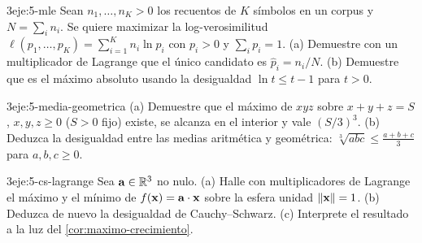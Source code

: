 \begin{ejercicio}{3}{eje:5-mle}
Sean $n_1,\dots,n_K>0$ los recuentos de $K$ símbolos en un corpus y $N=\sum_in_i$. Se quiere maximizar la log-verosimilitud $\ell(p_1,\dots,p_K)=\sum_{i=1}^{K}n_i\ln p_i$ con $p_i>0$ y $\sum_ip_i=1$. (a) Demuestre con un multiplicador de Lagrange que el único candidato es $\hat p_i=n_i/N$. (b) Demuestre que es el máximo absoluto usando la desigualdad $\ln t\le t-1$ para $t>0$.
\end{ejercicio}

\begin{ejercicio}{3}{eje:5-media-geometrica}
(a) Demuestre que el máximo de $xyz$ sobre $x+y+z=S$, $x,y,z\ge0$ ($S>0$ fijo) existe, se alcanza en el interior y vale $(S/3)^3$. (b) Deduzca la desigualdad entre las medias aritmética y geométrica: $\sqrt[3]{abc}\le\frac{a+b+c}{3}$ para $a,b,c\ge0$.
\end{ejercicio}

\begin{ejercicio}{3}{eje:5-cs-lagrange}
Sea $\mathbf{a}\in\mathbb{R}^3$ no nulo. (a) Halle con multiplicadores de Lagrange el máximo y el mínimo de $f(\mathbf{x})=\mathbf{a}\cdot\mathbf{x}$ sobre la esfera unidad $\lVert\mathbf{x}\rVert=1$. (b) Deduzca de nuevo la desigualdad de Cauchy--Schwarz. (c) Interprete el resultado a la luz del \cref{cor:maximo-crecimiento}.
\end{ejercicio}
